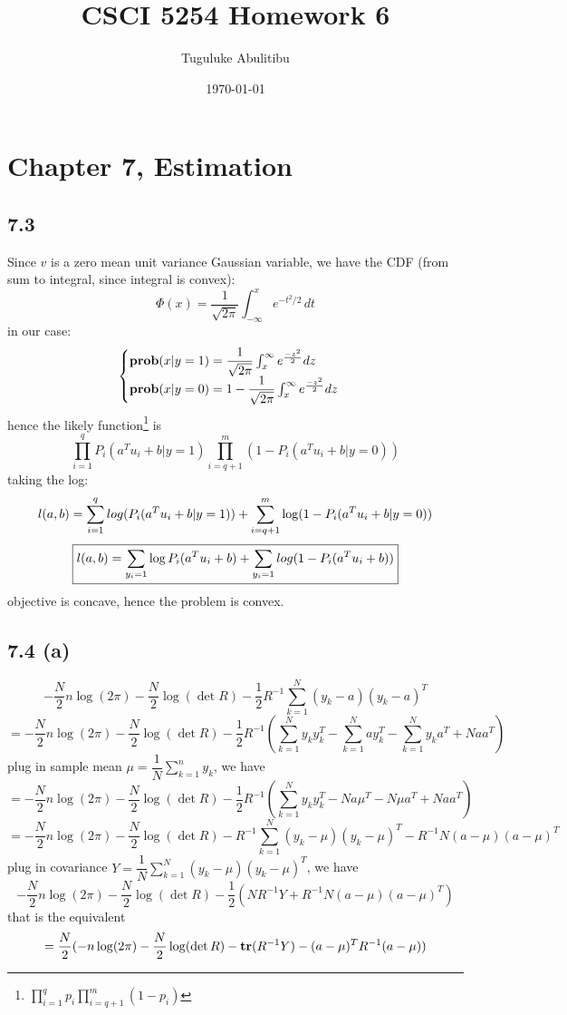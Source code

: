 \documentclass{article}
\title{CSCI 5254  Homework 6}
\author{Tuguluke Abulitibu}
\date{\today}
\newcommand{\tr}{{\mbox{\bf tr}}}
\newcommand{\prob}{{\mbox{\bf prob}}}
\begin{document}
\maketitle %
\section*{Chapter 7, Estimation}	
\subsection*{7.3}
Since $v$ is a zero mean unit variance Gaussian variable, we have the CDF (from sum to integral, since integral is convex):
\[{\displaystyle \Phi (x)={\frac {1}{\sqrt {2\pi }}}\int _{-\infty }^{x}e^{-t^{2}/2}\,dt}\]
in our case:
\[\begin{cases}
\prob(x|y=1) = \dfrac{1}{\sqrt{2 \pi}}\int_{x}^{\infty}e^{\frac{-z^2}{2}}dz\\
\prob(x|y=0) = 1 - \dfrac{1}{\sqrt{2 \pi}}\int_{x}^{\infty}e^{\frac{-z^2}{2}}dz
\end{cases}\]
hence the likely function\footnote{$\prod_{i=1}^q p_i \prod_{i=q+1}^m(1- p_i) $} is 
\[\prod_{i=1}^{q}P_i(a^Tu_i+b|y=1)\prod_{i=q+1}^{m}(1-P_i(a^Tu_i+b|y=0))\]
taking the log:
\[l(a,b) = \sum_{i=1}^{q}\\log(P_i(a^Tu_i+b|y=1))+\sum_{i=q+1}^{m}\log(1-P_i(a^Tu_i+b|y=0))\]
\[\boxed{l(a,b) = \sum _{y_i=1}\log P_i(a^Tu_i+b)+\sum_{y_i=1}\\log(1-P_i(a^Tu_i+b))}\]
objective is concave, hence the problem is convex.
\subsection*{7.4 (a)}
\[-\frac{N}{2}n\log(2\pi)-\frac{N}{2}\log(\det R)- \frac{1}{2}R^{-1}\sum_{k=1}^{N}(y_k-a)(y_k-a)^T\]
\[ = -\frac{N}{2}n\log(2\pi)-\frac{N}{2}\log(\det R)- \frac{1}{2}R^{-1}(\sum_{k=1}^{N}y_ky_k^T-\sum_{k=1}^{N}ay_k^T-\sum_{k=1}^{N}y_ka^T+Naa^T)\]
plug in sample mean $\mu = \dfrac{1}{N}\sum_{k = 1}^n y_k$, we have 
\[= -\frac{N}{2}n\log(2\pi)-\frac{N}{2}\log(\det R)- \frac{1}{2}R^{-1}(\sum_{k=1}^{N}y_ky_k^T-Na\mu^T-N\mu a^T+Naa^T)\]
\[=-\frac{N}{2}n\log(2\pi)-\frac{N}{2}\log(\det R)- R^{-1}\sum_{k=1}^{N}(y_k-\mu)(y_k-\mu)^T-R^{-1}N(a-\mu)(a-\mu)^T\]
plug in covariance $Y  = \dfrac{1}{N}\sum_{k=1}^N (y_k - \mu)(y_k - \mu)^T$, we have 
\[-\frac{N}{2}n\log(2\pi)-\frac{N}{2}\log(\det R)- \frac{1}{2}(NR^{-1}Y + R^{-1}N(a-\mu)(a-\mu)^T)\]
that is the equivalent 
\[ = \dfrac{N}{2}(-n\log(2\pi)-\frac{N}{2}\log(\det R)- \tr(R^{-1}Y) - (a-\mu)^TR^{-1}(a-\mu))\]
\end{document}
